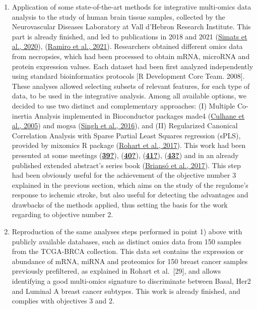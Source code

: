 \documentclass[a4paper, nobind]{templates/ociamthesis}
\begin{document}
\begin{enumerate}
\def\labelenumi{\arabic{enumi}.}
\item
  Application of some state-of-the-art methods for integrative multi-omics data analysis to the study of human brain tissue samples, collected by the Neurovascular Diseases Laboratory at Vall d'Hebron Research Institute. This part is already finished, and led to publications in 2018 and 2021 (\protect\hyperlink{ref-simats_mouse_2020}{Simats et al., 2020}), (\protect\hyperlink{ref-ramiro_integrative_2021}{Ramiro et al., 2021}). Researchers obtained different omics data from necropsies, which had been processed to obtain mRNA, microRNA and protein expression values. Each dataset had been first analyzed independently using standard bioinformatics protocols {[}R Development Core Team. 2008{]}. These analyses allowed selecting subsets of relevant features, for each type of data, to be used in the integrative analysis. Among all available options, we decided to use two distinct and complementary approaches: (I) Multiple Co-inertia Analysis implemented in Bioconductor packages made4 (\protect\hyperlink{ref-culhane_made4_2005}{Culhane et al., 2005}) and mogsa (\protect\hyperlink{ref-singh_diablo_2016}{Singh et al., 2016}), and (II) Regularized Canonical Correlation Analysis with Sparse Partial Least Squares regression (sPLS), provided by mixomics R package (\protect\hyperlink{ref-rohart_mixomics_2017}{Rohart et al., 2017}). This work had been presented at some meetings (\protect\hyperlink{ref-39}{\textbf{39?}}), (\protect\hyperlink{ref-40}{\textbf{40?}}), (\protect\hyperlink{ref-41}{\textbf{41?}}), (\protect\hyperlink{ref-43}{\textbf{43?}}) and in an already published extended abstract's series book (\protect\hyperlink{ref-brianso_integrative_2017}{Briansó et al., 2017}). This step had been obviously useful for the achievement of the objective number 3 explained in the previous section, which aims on the study of the regulome's response to ischemic stroke, but also useful for detecting the advantages and drawbacks of the methods applied, thus setting the basis for the work regarding to objective number 2.
\item
  Reproduction of the same analyses steps performed in point 1) above with publicly available databases, such as distinct omics data from 150 samples from the TCGA-BRCA collection. This data set contains the expression or abundance of mRNA, miRNA and proteomics for 150 breast cancer samples previously prefiltered, as explained in Rohart et al.~{[}29{]}, and allows identifying a good multi-omics signature to discriminate between Basal, Her2 and Luminal A breast cancer subtypes. This work is already finished, and complies with objectives 3 and 2.

\end{enumerate}
\end{document}
